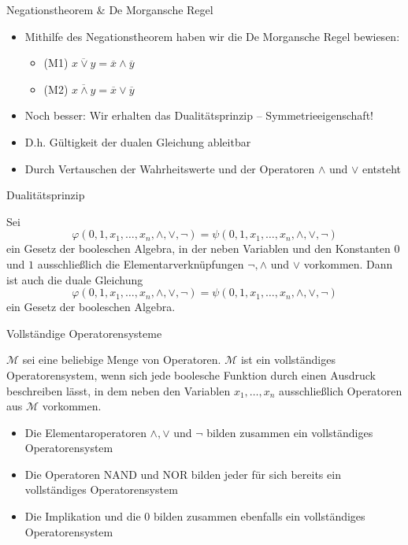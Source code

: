 \documentclass[12pt%
,aspectratio=169%
]{beamer}
\begin{document}
\begin{frame}{Negationstheorem \& De Morgansche Regel}
\begin{itemize}
	\item Mithilfe des Negationstheorem haben wir die De Morgansche Regel bewiesen:
	\begin{itemize}
		\item (M1) $\overline{x \lor y} = \overline{x} \land \overline{y}$
		\item (M2) $\overline{x \land y} = \overline{x} \lor \overline{y}$
	\end{itemize}
	\item Noch besser: Wir erhalten das Dualitätsprinzip -- Symmetrieeigenschaft!
	\item D.h. Gültigkeit der dualen Gleichung ableitbar
	\item Durch Vertauschen der Wahrheitswerte und der Operatoren $\land$ und $\lor$ entsteht 
\end{itemize}
\end{frame}

\begin{frame}{Dualitätsprinzip}
\begin{theorem}
Sei
$$
\varphi(0, 1, x_1 , \ldots, x_n , \land, \lor, \neg) = \psi(0, 1, x_1 , \ldots, x_n , \land, \lor, \neg)
$$
ein Gesetz der booleschen Algebra, in der neben Variablen und den Konstanten $0$ und $1$ ausschließlich die Elementarverknüpfungen $\neg, \land$ und $\lor$ vorkommen. Dann ist auch die duale Gleichung
$$
\varphi(0, 1, x_1 , \ldots, x_n , \land, \lor, \neg) = \psi(0, 1, x_1 , \ldots, x_n , \land, \lor, \neg)
$$
ein Gesetz der booleschen Algebra.
\end{theorem}
\end{frame}


\begin{frame}{Vollständige Operatorensysteme}
\begin{definition}
$\mathcal{M}$ sei eine beliebige Menge von Operatoren. $\mathcal{M}$ ist ein vollständiges Operatorensystem, wenn sich jede boolesche Funktion durch einen Ausdruck beschreiben lässt, in dem neben den Variablen $x_1 , \ldots , x_n$ ausschließlich Operatoren aus $\mathcal{M}$ vorkommen.
\end{definition}
\begin{itemize}
	\item Die Elementaroperatoren $\land, \lor$ und $\neg$ bilden zusammen ein vollständiges Operatorensystem
	\item Die Operatoren NAND und NOR bilden jeder für sich bereits ein vollständiges Operatorensystem
	\item Die Implikation und die $0$ bilden zusammen ebenfalls ein vollständiges Operatorensystem
\end{itemize}
\end{frame}
\end{document}
